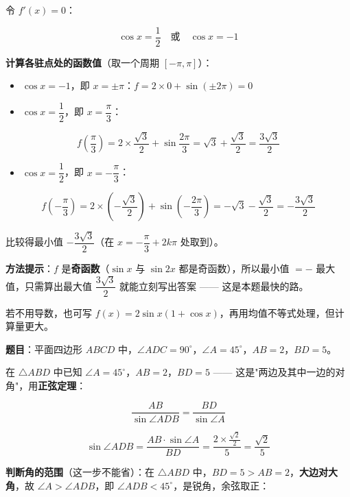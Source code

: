 令 $f'(x)=0$：

\[\cos x=\frac12\quad\text{或}\quad\cos x=-1\]

\textbf{计算各驻点处的函数值}（取一个周期 $[-\pi,\pi]$）：

\begin{itemize}
\item $\cos x=-1$，即 $x=\pm\pi$：$f=2\times0+\sin(\pm2\pi)=0$
\item $\cos x=\dfrac12$，即 $x=\dfrac\pi3$：
\end{itemize}
\[f\!\left(\frac\pi3\right)=2\times\frac{\sqrt3}2+\sin\frac{2\pi}3=\sqrt3+\frac{\sqrt3}2=\frac{3\sqrt3}2\]
\begin{itemize}
\item $\cos x=\dfrac12$，即 $x=-\dfrac\pi3$：
\end{itemize}
\[f\!\left(-\frac\pi3\right)=2\times\left(-\frac{\sqrt3}2\right)+\sin\left(-\frac{2\pi}3\right)=-\sqrt3-\frac{\sqrt3}2=-\frac{3\sqrt3}2\]

比较得最小值 $-\dfrac{3\sqrt3}2$（在 $x=-\dfrac\pi3+2k\pi$ 处取到）。


\begin{gktip}
\textbf{方法提示}：$f$ 是\textbf{奇函数}（$\sin x$ 与 $\sin2x$ 都是奇函数），所以最小值 $=-$ 最大值，只需算出最大值 $\dfrac{3\sqrt3}2$ 就能立刻写出答案 —— 这是本题最快的路。

若不用导数，也可写 $f(x)=2\sin x(1+\cos x)$，再用均值不等式处理，但计算量更大。
\end{gktip}

\par\medskip



\textbf{题目}：平面四边形 $ABCD$ 中，$\angle ADC=90^\circ$，$\angle A=45^\circ$，$AB=2$，$BD=5$。


在 $\triangle ABD$ 中已知 $\angle A=45^\circ$，$AB=2$，$BD=5$ —— 这是"两边及其中一边的对角"，用\textbf{正弦定理}：

\[\frac{AB}{\sin\angle ADB}=\frac{BD}{\sin\angle A}\]

\[\sin\angle ADB=\frac{AB\cdot\sin\angle A}{BD}=\frac{2\times\frac{\sqrt2}2}5=\frac{\sqrt2}5\]

\textbf{判断角的范围}（这一步不能省）：在 $\triangle ABD$ 中，$BD=5>AB=2$，\textbf{大边对大角}，故 $\angle A>\angle ADB$，即 $\angle ADB<45^\circ$，是锐角，余弦取正：

